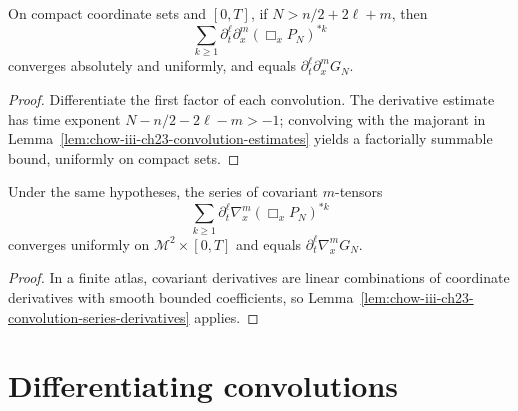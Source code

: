\begin{lemma}
\label{lem:chow-iii-ch23-convolution-series-derivatives}


On compact coordinate sets and $[0,T]$, if $N>n/2+2\ell+m$, then
\[
\sum_{k\ge1}\partial_t^\ell\partial_x^m(\Box_xP_N)^{*k}
\]
converges absolutely and uniformly, and equals
\(\partial_t^\ell\partial_x^mG_N\).
\end{lemma}
\begin{proof}
\sketch Differentiate the first factor of each convolution.  The derivative estimate
has time exponent $N-n/2-2\ell-m>-1$; convolving with the majorant in
Lemma~\ref{lem:chow-iii-ch23-convolution-estimates} yields a factorially summable
bound, uniformly on compact sets.
\end{proof}

\begin{lemma}
\label{lem:chow-iii-ch23-convolution-series-covariant}


Under the same hypotheses, the series of covariant $m$-tensors
\[
\sum_{k\ge1}\partial_t^\ell\nabla_x^m(\Box_xP_N)^{*k}
\]
converges uniformly on $\mathcal M^2\times[0,T]$ and equals
\(\partial_t^\ell\nabla_x^mG_N\).
\end{lemma}
\begin{proof}
\sketch In a finite atlas, covariant derivatives are linear combinations of coordinate
derivatives with smooth bounded coefficients, so Lemma~\ref{lem:chow-iii-ch23-convolution-series-derivatives} applies.
\end{proof}

\section{Differentiating convolutions}

